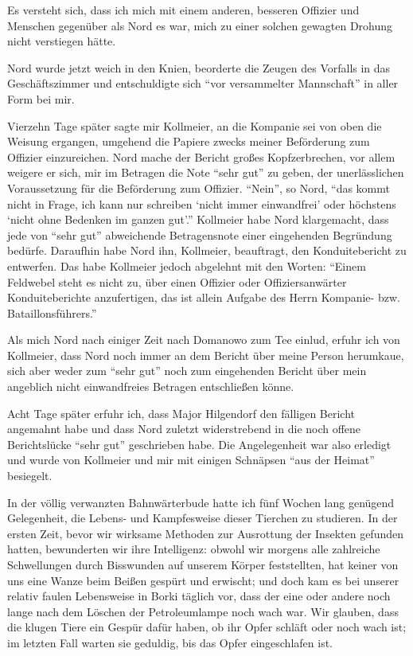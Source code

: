 Es versteht sich, dass ich mich mit einem anderen, besseren Offizier und Menschen gegenüber als Nord es war, mich zu einer solchen gewagten Drohung nicht verstiegen hätte.

Nord wurde jetzt weich in den Knien, beorderte die Zeugen des Vorfalls in das Geschäftszimmer und entschuldigte sich \enquote{vor versammelter Mannschaft} in aller Form bei mir.

Vierzehn Tage später sagte mir Kollmeier, an die Kompanie sei von oben die Weisung ergangen, umgehend die Papiere zwecks meiner Beförderung zum Offizier einzureichen. Nord mache der Bericht großes Kopfzerbrechen, vor allem weigere er sich, mir im Betragen die Note \enquote{sehr gut} zu geben, der unerlässlichen Voraussetzung für die Beförderung zum Offizier. \enquote{Nein}, so Nord, \enquote{das kommt nicht in Frage, ich kann nur schreiben \enquote{nicht immer einwandfrei} oder höchstens \enquote{nicht ohne Bedenken im ganzen gut}.} Kollmeier habe Nord klargemacht, dass jede von \enquote{sehr gut} abweichende Betragensnote einer eingehenden Begründung bedürfe. Daraufhin habe Nord ihn, Kollmeier, beauftragt, den Konduitebericht zu entwerfen. Das habe Kollmeier jedoch abgelehnt mit den Worten: \enquote{Einem Feldwebel steht es nicht zu, über einen Offizier oder Offiziersanwärter Konduiteberichte anzufertigen, das ist allein Aufgabe des Herrn Kompanie- bzw. Bataillonsführers.}

Als mich Nord nach einiger Zeit nach Domanowo zum Tee einlud, erfuhr ich von Kollmeier, dass Nord noch immer an dem Bericht über meine Person herumkaue, sich aber weder zum \enquote{sehr gut} noch zum eingehenden Bericht über mein angeblich nicht einwandfreies Betragen entschließen könne.

Acht Tage später erfuhr ich, dass Major Hilgendorf den fälligen Bericht angemahnt habe und dass Nord zuletzt widerstrebend in die noch offene Berichtslücke \enquote{sehr gut} geschrieben habe. Die Angelegenheit war also erledigt und wurde von Kollmeier und mir mit einigen Schnäpsen \enquote{aus der Heimat} besiegelt.

In der völlig verwanzten Bahnwärterbude hatte ich fünf Wochen lang genügend Gelegenheit, die Lebens- und Kampfesweise dieser Tierchen zu studieren. In der ersten Zeit, bevor wir wirksame Methoden zur Ausrottung der Insekten gefunden hatten, bewunderten wir ihre Intelligenz: obwohl wir morgens alle zahlreiche Schwellungen durch Bisswunden auf unserem Körper feststellten, hat keiner von uns eine Wanze beim Beißen gespürt und erwischt; und doch kam es bei unserer relativ faulen Lebensweise in Borki täglich vor, dass der eine oder andere noch lange nach dem Löschen der Petroleumlampe noch wach war. Wir glauben, dass die klugen Tiere ein Gespür dafür haben, ob ihr Opfer schläft oder noch wach ist; im letzten Fall warten sie geduldig, bis das Opfer eingeschlafen ist.

